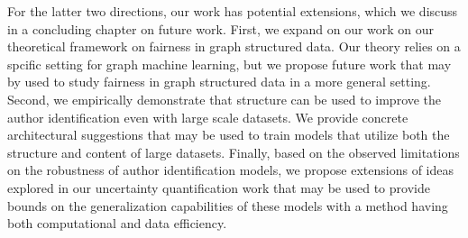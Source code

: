 For the latter two directions, our work has potential extensions, which we discuss in a concluding chapter on future work.
First, we expand on our work on our theoretical framework on fairness in graph structured data.
Our theory relies on a spcific setting for graph machine learning, but we propose future work that may by used to study fairness in graph structured data in a more general setting.
Second, we empirically demonstrate that structure can be used to improve the author identification even with large scale datasets.
We provide concrete architectural suggestions that may be used to train models that utilize both the structure and content of large datasets.
Finally, based on the observed limitations on the robustness of author identification models, we propose extensions of ideas explored in our uncertainty quantification work that may be used to provide bounds on the generalization capabilities of these models with a method having both computational and data efficiency.

\endinput